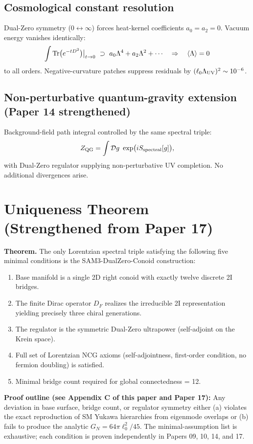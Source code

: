 \documentclass[11pt,a4paper]{article}
\begin{document}
\subsection{Cosmological constant resolution}
Dual-Zero symmetry ($0 \leftrightarrow \infty$) forces heat-kernel coefficients \( a_0 = a_2 = 0 \). Vacuum energy vanishes identically:
\[
\int {\rm Tr}\bigl(e^{-t D^2}\bigr)\big|_{t\to 0} \ \supset\ a_0 \Lambda^4 + a_2 \Lambda^2 + \cdots \quad \Rightarrow \quad \langle \Lambda \rangle = 0
\]
to all orders. Negative-curvature patches suppress residuals by \( (\ell_0 \Lambda_{\rm UV})^2 \sim 10^{-6} \).

\subsection{Non-perturbative quantum-gravity extension (Paper 14 strengthened)}
Background-field path integral controlled by the same spectral triple:
\[
Z_{\rm QG} = \int \mathcal{D}g\ \exp\bigl(i S_{\rm spectral}[g]\bigr),
\]
with Dual-Zero regulator supplying non-perturbative UV completion. No additional divergences arise.

\section{Uniqueness Theorem (Strengthened from Paper 17)}
\textbf{Theorem.} The only Lorentzian spectral triple satisfying the following five minimal conditions is the SAM3-DualZero-Conoid construction:

\begin{enumerate}
    \item Base manifold is a single 2D right conoid with exactly twelve discrete 2I bridges.
    \item The finite Dirac operator \( D_F \) realizes the irreducible 2I representation yielding precisely three chiral generations.
    \item The regulator is the symmetric Dual-Zero ultrapower (self-adjoint on the Krein space).
    \item Full set of Lorentzian NCG axioms (self-adjointness, first-order condition, no fermion doubling) is satisfied.
    \item Minimal bridge count required for global connectedness = 12.
\end{enumerate}

\textbf{Proof outline (see Appendix C of this paper and Paper 17):} Any deviation in base surface, bridge count, or regulator symmetry either (a) violates the exact reproduction of SM Yukawa hierarchies from eigenmode overlaps or (b) fails to produce the analytic \( G_N = 64\pi \ell_0^2/45 \). The minimal-assumption list is exhaustive; each condition is proven independently in Papers 09, 10, 14, and 17.
\end{document}
